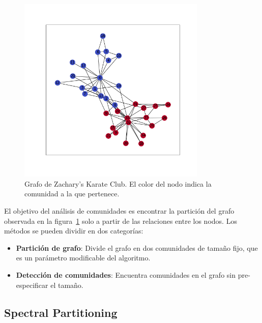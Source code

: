 \documentclass{article}
\begin{document}
\begin{figure}[htb]
    \centering
    \includegraphics[width=0.8\textwidth]{imagenes/karate_club.png}
    \caption{Grafo de Zachary's Karate Club. El color del nodo indica la comunidad a la que pertenece.}
    \label{fig: karate_club}
\end{figure}


El objetivo del análisis de comunidades es encontrar la partición del grafo observada en la figura~\ref{fig: karate_club} solo a partir de las relaciones entre los nodos. Los métodos se pueden dividir en dos categorías:
\begin{itemize}
    \item \textbf{Partición de grafo}: Divide el grafo en dos comunidades de tamaño fijo, que es un parámetro modificable del algoritmo.
    \item \textbf{Detección de comunidades}: Encuentra comunidades en el grafo sin pre-especificar el tamaño.
\end{itemize}

\subsection{Spectral Partitioning}
\end{document}
